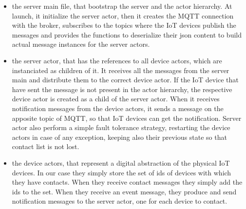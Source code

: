 \documentclass[10pt]{article}
\begin{document}
	\begin{itemize}
		\item the server main file, that bootstrap the server and the actor hierarchy. At launch, it initialize the server actor, then it creates the MQTT connection with the broker, subscribes to the topics where the IoT devices publish the messages and provides the functions to deserialize their json content to build actual message instances for the server actors.
		\item the server actor, that has the references to all device actors, which are instanciated as children of it. It receives all the messages from the server main and distribute them to the correct device actor. If the IoT device that have sent the message is not present in the actor hierarchy, the respective device actor is created as a child of the server actor. When it receives notification messages from the device actors, it sends a message on the apposite topic of MQTT, so that IoT devices can get the notification. Server actor also perform a simple fault tolerance strategy, restarting the device actors in case of any exception, keeping also their previous state so that contact list is not lost.
		\item the device actors, that represent a digital abstraction of the physical IoT devices. In our case they simply store the set of ids of devices with which they have contacts. When they receive contact messages they simply add the ids to the set. When they receive an event message, they produce and send notification messages to the server actor, one for each device to contact.
	\end{itemize}      
	
	
	
\end{document}
